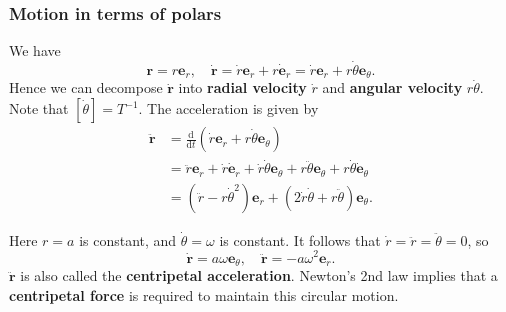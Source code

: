 \subsubsection*{Motion in terms of polars}
We have
\[
    \mathbf{r} = r\mathbf{e}_r,\quad \dot{\mathbf{r}} = \dot{r} \mathbf{e}_r + r \dot{\mathbf{e}}_r = \dot{r}\mathbf{e}_r+r\dot{\theta}\mathbf{e}_\theta.
\]
Hence we can decompose $ \dot{\mathbf{r}} $ into \textbf{radial velocity} $ \dot{r} $ and \textbf{angular velocity} $ r\dot{\theta} $. Note that $ [\dot{\theta}] = T^{-1} $. The acceleration is given by
\begin{align*}
    \ddot{\mathbf{r}} &= \frac{\mathrm{d}}{\mathrm{d}t}\left( \dot{r}\mathbf{e}_r+r\dot{\theta}\mathbf{e}_\theta  \right)\\
    &=  \ddot{r}\mathbf{e}_r+\dot{r}\dot{\mathbf{e}}_r+\dot{r}\dot{\theta}\mathbf{e}_\theta+r \ddot{\theta}\mathbf{e}_\theta+r \dot{\theta}\dot{\mathbf{e}}_\theta\\ 
    &= \left( \ddot{r}-r\dot{\theta}^2 \right)\mathbf{e}_r+\left( 2 \dot{r}\dot{\theta}+r \ddot{\theta} \right)\mathbf{e}_\theta.
\end{align*}
\begin{example}
    Here $ r=a $ is constant, and $ \dot{\theta} = \omega $ is constant. It follows that $ \dot{r}=\ddot{r}=\ddot{\theta}=0 $, so 
    \[
        \dot{\mathbf{r}} = a \omega \mathbf{e}_\theta,\quad \ddot{\mathbf{r}} = -a\omega^2\mathbf{e}_r.
    \]
    $ \ddot{\mathbf{r}} $ is also called the \textbf{centripetal acceleration}. Newton's 2nd law implies that a \textbf{centripetal force} is required to maintain this circular motion.

    \begin{center}
    \end{center}
\end{example}

